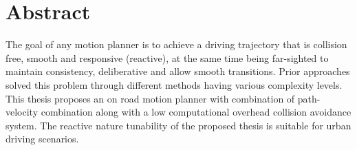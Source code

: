 \chapter*{Abstract}
The goal of any motion planner is to achieve a driving trajectory that is collision free, smooth and responsive (reactive), at the same time being far-sighted to maintain consistency, deliberative and allow smooth transitions. Prior approaches solved this problem through different methods having various complexity levels. This thesis proposes an on road motion planner with combination of path-velocity combination along with a low computational overhead collision avoidance system. The reactive nature tunability of the proposed thesis is suitable for urban driving scenarios. 
